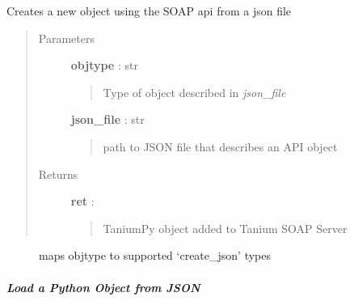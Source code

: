 \documentclass[letterpaper,10pt,english]{sphinxmanual}
\begin{document}
\begin{fulllineitems}
\label{pytan.handler:pytan.handler.Handler.create_from_json}
Creates a new object using the SOAP api from a json file
\begin{quote}\begin{description}
\item[{Parameters}] \leavevmode
\textbf{objtype} : str
\begin{quote}

Type of object described in \emph{json\_file}
\end{quote}

\textbf{json\_file} : str
\begin{quote}

path to JSON file that describes an API object
\end{quote}

\item[{Returns}] \leavevmode
\textbf{ret} : {\hyperref[taniumpy.object_types:taniumpy.object_types.base.BaseType]{}}
\begin{quote}

TaniumPy object added to Tanium SOAP Server
\end{quote}

\end{description}\end{quote}



\begin{description}
\item[{{\hyperref[pytan.constants:pytan.constants.GET_OBJ_MAP]{}}}] \leavevmode
maps objtype to supported `create\_json' types

\end{description}



\end{fulllineitems}



\subparagraph{Load a Python Object from JSON}
\label{pytan.handler:load-a-python-object-from-json}
\end{document}
